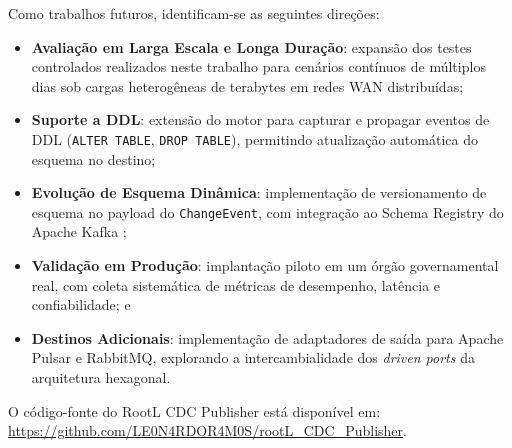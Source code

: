 \documentclass[12pt]{article}
\begin{document}
Como trabalhos futuros, identificam-se as seguintes direções:
\begin{itemize}
  \item \textbf{Avaliação em Larga Escala e Longa Duração}: expansão dos testes
        controlados realizados neste trabalho para cenários contínuos de múltiplos dias sob
        cargas heterogêneas de terabytes em redes WAN distribuídas;
  \item \textbf{Suporte a DDL}: extensão do motor para capturar e propagar
        eventos de DDL (\texttt{ALTER TABLE}, \texttt{DROP TABLE}),
        permitindo atualização automática do esquema no destino;
  \item \textbf{Evolução de Esquema Dinâmica}: implementação de versionamento
        de esquema no payload do \texttt{ChangeEvent}, com integração ao
        Schema Registry do Apache Kafka \cite{kleppmann:2017};
  \item \textbf{Validação em Produção}: implantação piloto em um órgão
        governamental real, com coleta sistemática de métricas de
        desempenho, latência e confiabilidade; e
  \item \textbf{Destinos Adicionais}: implementação de adaptadores de saída
        para Apache Pulsar e RabbitMQ, explorando a intercambialidade dos
        \textit{driven ports} da arquitetura hexagonal.
\end{itemize}

O código-fonte do RootL CDC Publisher está disponível em:
\url{https://github.com/LE0N4RDOR4M0S/rootL_CDC_Publisher}.




\end{document}
